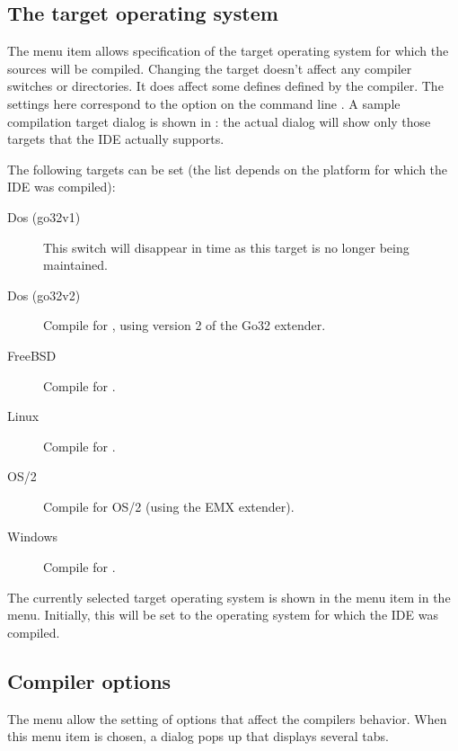 \subsection{The target operating system}
The menu item  allows  specification of the target
operating system for which the sources will be compiled.
Changing the target doesn't affect any compiler switches or
directories. It does affect some defines defined by the compiler.
The settings here correspond to the option on the command line 
. A sample compilation target dialog is shown in :
the actual dialog will show only those targets that the IDE actually 
supports.


The following targets can be set (the list depends on the platform for
which the IDE was compiled):
\begin{description}
\item[Dos (go32v1)] This switch will disappear in time as this target is no
longer being maintained.
\item[Dos (go32v2)] Compile for \dos, using version 2 of the Go32 extender.
\item[FreeBSD] Compile for \freebsd.
\item[Linux] Compile for \linux.
\item[OS/2] Compile for OS/2 (using the EMX extender).
\item[Windows] Compile for \windows.
\end{description}
The currently selected target operating system is shown in the 
 menu item in the  menu. Initially, 
this will be set to the operating system for which the IDE was compiled.
%
%
\subsection{Compiler options}
The menu  allow the setting of options that affect the
compilers behavior. When this menu item is chosen, a dialog pops up that
displays several tabs.


